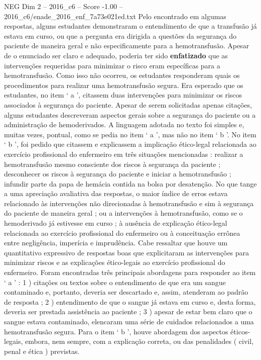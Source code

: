 \begin{textsample}{NEG Dim 2 – 2016\_c6 – Score -1.00 – 2016\_c6/enade\_2016\_enf\_7a73e021ed.txt}
Pelo encontrado em algumas respostas, alguns estudantes demonstraram o entendimento de que a transfusão já estava em curso, ou que a pergunta era dirigida a questões da segurança do paciente de maneira geral e não especificamente para a hemotransfusão.
Apesar de o enunciado ser claro e adequado, poderia ter sido \textbf{enfatizado} que as intervenções requeridas para minimizar o risco eram específicas para a hemotransfusão.
Como isso não ocorreu, os estudantes responderam quais os procedimentos para realizar uma hemotransfusão segura.
Era esperado que os estudantes, no item ‘ a ’, citassem duas intervenções para minimizar os riscos associados à segurança do paciente.
Apesar de serem solicitadas apenas citações, alguns estudantes descreveram aspectos gerais sobre a segurança do paciente ou a administração de hemoderivados.
A linguagem adotada no texto foi simples e, muitas vezes, pontual, como se pedia no item ‘ a ’, mas não no item ‘ b ’.
No item ‘ b ’, foi pedido que citassem e explicassem a implicação ético-legal relacionada ao exercício profissional do enfermeiro em três situações mencionadas : realizar a hemotransfusão mesmo consciente dos riscos à segurança da paciente ; desconhecer os riscos à segurança do paciente e iniciar a hemotransfusão ; infundir parte da papa de hemácia contida na bolsa por desatenção.
No que tange a uma apreciação avaliativa das respostas, o maior índice de erros estava relacionado às intervenções não direcionadas à hemotransfusão e sim à segurança do paciente de maneira geral ; ou a intervenções à hemotransfusão, como se o hemoderivado já estivesse em curso ; à ausência de explicação ético-legal relacionada ao exercício profissional do enfermeiro ou à conceituação errônea entre negligência, imperícia e imprudência.
Cabe ressaltar que houve um quantitativo expressivo de respostas boas que explicitaram as intervenções para minimizar riscos e as explicações ético-legais ao exercício profissional do enfermeiro.
Foram encontradas três principais abordagens para responder ao item ‘ a ’ : 1 ) citações ou textos sobre o entendimento de que era um sangue contaminado e, portanto, deveria ser descartado e, assim, atenderam ao padrão de resposta ; 2 ) entendimento de que o sangue já estava em curso e, desta forma, deveria ser prestada assistência ao paciente ; 3 ) apesar de estar bem claro que o sangue estava contaminado, elencaram uma série de cuidados relacionados a uma hemotransfusão segura.
Para o item ‘ b ’, houve abordagem dos aspectos éticos-legais, embora, nem sempre, com a explicação correta, ou das penalidades ( civil, penal e ética ) previstas.

\end{textsample}

